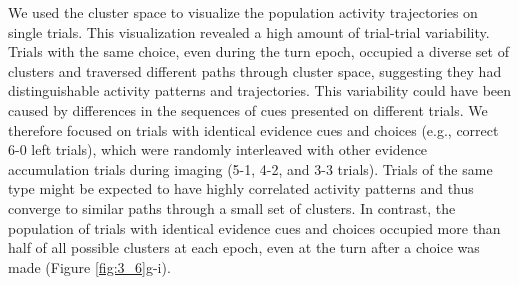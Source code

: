 \bigskip
We used the cluster space to visualize the population activity trajectories on single trials. This visualization revealed a high amount of trial-trial variability. Trials with the same choice, even during the turn epoch, occupied a diverse set of clusters and traversed different paths through cluster space, suggesting they had distinguishable activity patterns and trajectories. This variability could have been caused by differences in the sequences of cues presented on different trials. We therefore focused on trials with identical evidence cues and choices (e.g., correct 6-0 left trials), which were randomly interleaved with other evidence accumulation trials during imaging (5-1, 4-2, and 3-3 trials).  Trials of the same type might be expected to have highly correlated activity patterns and thus converge to similar paths through a small set of clusters. In contrast, the population of trials with identical evidence cues and choices occupied more than half of all possible clusters at each epoch, even at the turn after a choice was made (Figure \ref{fig:3_6}g-i).


